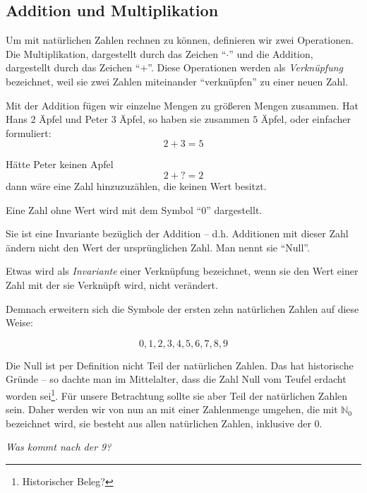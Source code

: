 \subsection{Addition und Multiplikation}

\begin{definition}
Um mit natürlichen Zahlen rechnen zu können, definieren wir zwei Operationen. Die Multiplikation, dargestellt durch das Zeichen "`$\cdot$"' und die Addition, dargestellt durch das Zeichen "`$+$"'. Diese Operationen werden als \emph{Verknüpfung} bezeichnet, weil sie zwei Zahlen miteinander "`verknüpfen"' zu einer neuen Zahl.
\end{definition}

Mit der Addition fügen wir einzelne Mengen zu größeren Mengen zusammen. Hat Hans $2$ Äpfel und Peter $3$ Äpfel, so haben sie zusammen $5$ Äpfel, oder einfacher formuliert:
\[
2+3=5
\]

\noindent Hätte Peter keinen Apfel
\[2+?=2\]
dann wäre eine Zahl hinzuzuzählen, die keinen Wert besitzt. 
\begin{definition}
Eine Zahl ohne Wert wird mit dem Symbol "`0"' dargestellt.
\end{definition}

Sie ist eine Invariante bezüglich der Addition -- d.h. Additionen mit dieser Zahl ändern nicht den Wert der ursprünglichen Zahl. Man nennt sie "`Null"'. 

\begin{definition}
Etwas wird als \emph{Invariante} einer Verknüpfung bezeichnet, wenn sie den Wert einer Zahl mit der sie Verknüpft wird, nicht verändert.
\end{definition}

Demnach erweitern sich die Symbole der ersten zehn natürlichen Zahlen auf diese Weise:

\[0,1,2,3,4,5,6,7,8,9\]

Die Null ist per Definition nicht Teil der natürlichen Zahlen. Das hat historische Gründe -- so dachte man im Mittelalter, dass die Zahl Null vom Teufel erdacht worden sei\footnote{Historischer Beleg?}. Für unsere Betrachtung sollte sie aber Teil der natürlichen Zahlen sein. Daher werden wir von nun an mit einer Zahlenmenge umgehen, die mit $\mathbb{N}_0$ bezeichnet wird, sie besteht aus allen natürlichen Zahlen, inklusive der 0.

\textsl{Was kommt nach der 9?}

